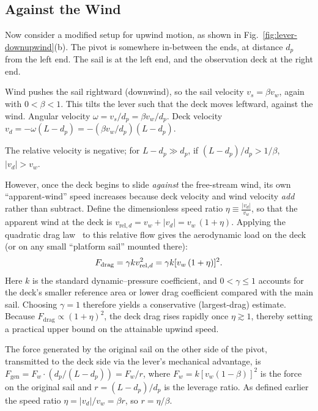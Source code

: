 \documentclass[reprint,aps,pra,superscriptaddress,longbibliography]{revtex4-2}
\begin{document}
\subsection{Against the Wind}

Now consider a modified setup for upwind motion, as shown in Fig.~\ref{fig:lever-downupwind}(b). The pivot is somewhere in-between the ends, at distance $d_p$ from the left end. The sail is at the left end, and the observation deck at the right end.

Wind pushes the sail rightward (downwind), so the sail velocity $v_s = \beta v_w$, again with $0 <\beta <1$. This tilts the lever such that the deck moves leftward, against the wind. Angular velocity $\omega = v_s / d_p = \beta v_w / d_p$. Deck velocity $v_d = -\omega (L - d_p) = -(\beta v_w / d_p) (L - d_p)$.

The relative velocity is negative; for $L - d_p \gg d_p$, if $(L - d_p)/d_p > 1/\beta$, $|v_d| > v_w$.

However, once the deck begins to slide \emph{against} the free-stream
wind, its own ``apparent-wind'' speed increases because deck velocity
and wind velocity \emph{add} rather than subtract.  Define the
dimensionless speed ratio
$\eta \equiv \frac{|v_d|}{v_w}$,
so that the apparent wind at the deck is
$v_{\text{rel},d} = v_w + |v_d|= v_w\,(1+\eta)$.
Applying the quadratic drag law~\cite{Anderson2024} to this relative flow gives the aerodynamic load on the deck
(or on any small ``platform sail'' mounted there):
\begin{align}
F_\text{drag}
= \gamma k v_{\text{rel},d}^2
= \gamma k [v_w\,(1+\eta)]^2
. \notag
\end{align}
Here $k$ is the standard dynamic--pressure coefficient, and
$0<\gamma\le 1$ accounts for the deck's smaller reference area or lower
drag coefficient compared with the main sail. Choosing $\gamma=1$
therefore yields a conservative (largest-drag) estimate.   Because
$F_{\text{drag}}\propto(1+\eta)^{2}$, the deck drag rises rapidly once
$\eta \gtrsim 1$, thereby setting a practical upper bound on the attainable upwind speed.

The force generated by the original sail on the other side of the pivot,
 transmitted to the deck side via the lever's mechanical advantage,
is $F_\text{gen} = F_w \cdot (d_p / (L - d_p)) = F_w / r$, where $F_w = k [v_w (1 - \beta)]^2$
is the force on the original sail and $r = (L - d_p)/d_p$ is the leverage ratio.
As defined earlier the speed ratio $\eta = |v_d| / v_w = \beta r$, so $r = \eta / \beta$.
\end{document}
